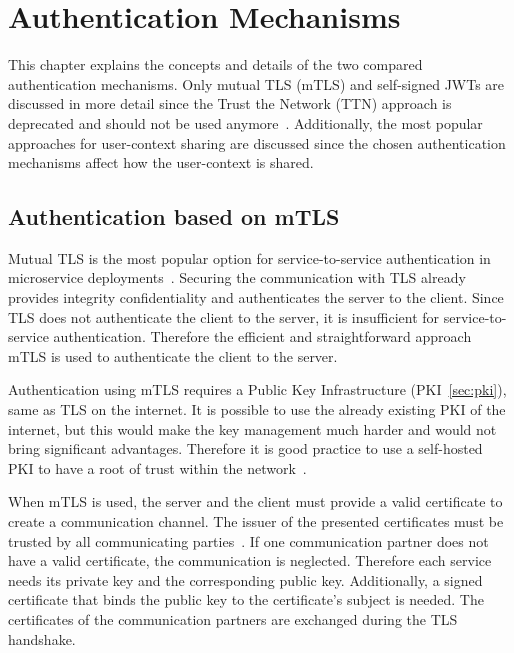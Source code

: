 \chapter{Authentication Mechanisms}
\label{cha:authentication_mechanisms}
This chapter explains the concepts and details of the two compared authentication mechanisms.
Only mutual TLS (mTLS) and self-signed JWTs are discussed in more detail since the Trust the Network (TTN) approach is deprecated and should not be used anymore~\cite{dias2020microservices}.
Additionally, the most popular approaches for user-context sharing are discussed since the chosen authentication mechanisms affect how the user-context is shared.


\section{Authentication based on mTLS}
Mutual TLS is the most popular option for service-to-service authentication in microservice deployments~\cite{dias2020microservices}.
Securing the communication with TLS already provides integrity confidentiality and authenticates the server to the client.
Since TLS does not authenticate the client to the server, it is insufficient for service-to-service authentication.
Therefore the efficient and straightforward approach mTLS is used to authenticate the client to the server.

Authentication using mTLS requires a Public Key Infrastructure (PKI~\ref{sec:pki}), same as TLS on the internet.
It is possible to use the already existing PKI of the internet, but this would make the key management much harder and would not bring significant advantages.
Therefore it is good practice to use a self-hosted PKI to have a root of trust within the network~\cite{dias2020microservices}.

When mTLS is used, the server and the client must provide a valid certificate to create a communication channel.
The issuer of the presented certificates must be trusted by all communicating parties~\cite{dias2020microservices}.
If one communication partner does not have a valid certificate, the communication is neglected.
Therefore each service needs its private key and the corresponding public key.
Additionally, a signed certificate that binds the public key to the certificate's subject is needed.
The certificates of the communication partners are exchanged during the TLS handshake.

